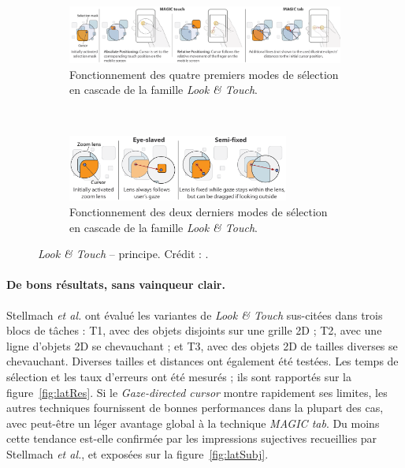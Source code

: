 	\begin{figure}[!htbp]
		\centering
		\begin{subfigure}[t]{\textwidth}
			\centering
			\includegraphics[width=\textwidth]{figures/ch2/lookandtouch}
			\caption[\emph{Look \&{} Touch -- principe}]{Fonctionnement des quatre premiers modes de sélection en cascade de la famille \emph{Look \&{} Touch}.}
			\label{fig:lookandtouch}
		\end{subfigure}
		~
		\begin{subfigure}[t]{\textwidth}
			\centering
			\includegraphics[width=0.8\textwidth]{figures/ch2/lookandtouch2}
			\caption[\emph{Look \&{} Touch -- principe II}]{Fonctionnement des deux derniers modes de sélection en cascade de la famille \emph{Look \&{} Touch}.}
			\label{fig:lookandtouch2}
		\end{subfigure}
		\caption[\emph{Look \&{} Touch} -- principe]{\emph{Look \&{} Touch} -- principe. Crédit : \cite{stellmach2012look}.}
		\label{lookAndTouchPrinciple}
	\end{figure}
	
	\paragraph{De bons résultats, sans vainqueur clair.}
	Stellmach \emph{et al.} ont évalué les variantes de \emph{Look \&{} Touch} sus-citées dans trois blocs de tâches : T1, avec des objets disjoints sur une grille 2D ; T2, avec une ligne d'objets 2D se chevauchant ; et T3, avec des objets 2D de tailles diverses se chevauchant. Diverses tailles et distances ont également été testées. Les temps de sélection et les taux d'erreurs ont été mesurés ; ils sont rapportés sur la figure~\ref{fig:latRes}. Si le \emph{Gaze-directed cursor} montre rapidement ses limites, les autres techniques fournissent de bonnes performances dans la plupart des cas, avec peut-être un léger avantage global à la technique \emph{MAGIC tab}. Du moins cette tendance est-elle confirmée par les impressions sujectives recueillies par Stellmach \emph{et al.}, et exposées sur la figure~\ref{fig:latSubj}.
	
